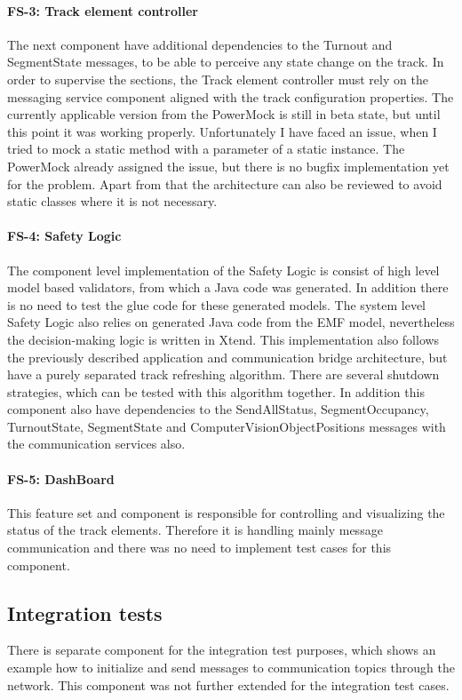 \paragraph{FS-3: Track element controller} The next component have additional dependencies to the Turnout and SegmentState messages, to be able to perceive any state change on the track. In order to supervise the sections, the Track element controller must rely on the messaging service component aligned with the track configuration properties. The currently applicable version from the PowerMock is still in beta state, but until this point it was working properly. Unfortunately I have faced an issue, when I tried to mock a static method with a parameter of a static instance. The PowerMock already assigned the issue, but there is no bugfix implementation yet for the problem. Apart from that the architecture can also be reviewed to avoid static classes where it is not necessary.

\paragraph{FS-4: Safety Logic} The component level implementation of the Safety Logic is consist of high level model based validators, from which a Java code was generated. In addition there is no need to test the glue code for these generated models. The system level Safety Logic also relies on generated Java code from the EMF model, nevertheless the decision-making logic is written in Xtend. This implementation also follows the previously described application and communication bridge architecture, but have a purely separated track refreshing algorithm. There are several shutdown strategies, which can be tested with this algorithm together. In addition this component also have dependencies to the SendAllStatus, SegmentOccupancy, TurnoutState, SegmentState and ComputerVisionObjectPositions messages with the communication services also.

\paragraph{FS-5: DashBoard} This feature set and component is responsible for controlling and visualizing the status of the track elements. Therefore it is handling mainly message communication and there was no need to implement test cases for this component.

\subsection{Integration tests}
There is separate component for the integration test purposes, which shows an example how to initialize and send messages to communication topics through the network. This component was not further extended for the integration test cases.

